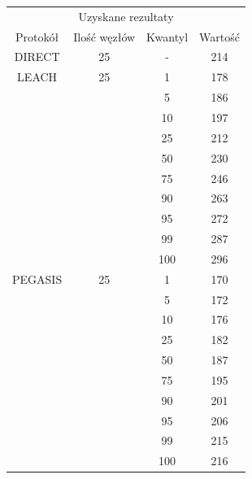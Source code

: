 \documentclass[a4paper,12pt,twoside,openany]{report}
\begin{document}
\begin{longtable}{*{4}{c}}
\toprule
\multicolumn{4}{c}{Uzyskane rezultaty} \\
Protokół	& Ilość węzłów	& Kwantyl	& Wartość \\
\midrule
\endhead
DIRECT	& 25 	& -	& 214 \\*
\midrule
LEACH	& 25	& 1	& 178 \\*
	&	& 5	& 186 \\*
	&	& 10	& 197 \\*
	&	& 25	& 212 \\*
	&	& 50	& 230 \\*
	&	& 75	& 246 \\*
	&	& 90	& 263 \\*
	&	& 95	& 272 \\*
	&	& 99	& 287 \\*
	&	& 100	& 296 \\*
\midrule
PEGASIS	& 25	& 1	& 170 \\*
	&	& 5	& 172 \\*
	&	& 10	& 176 \\*
	&	& 25	& 182 \\*
	&	& 50	& 187 \\*
	&	& 75	& 195 \\*
	&	& 90	& 201 \\*
	&	& 95	& 206 \\*
	&	& 99	& 215 \\*
	&	& 100	& 216 \\*
\bottomrule
\end{longtable}
\end{document}

